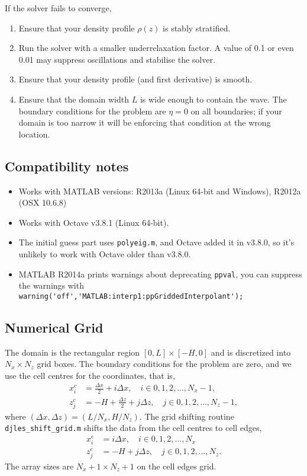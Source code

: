 \documentclass[letterpaper]{article}
\begin{document}
If the solver fails to converge, 
\begin{enumerate}
 \item Ensure that your density profile $\rho(z)$ is stably stratified.
 \item Run the solver with a smaller underrelaxation factor. A value of 0.1 or even 0.01 may suppress oscillations and stabilise the solver. 
 \item Ensure that your density profile (and first derivative) is smooth.
 \item Ensure that the domain width $L$ is wide enough to contain the wave. The boundary conditions for the problem are $\eta=0$ on all boundaries; if your domain is too narrow it will be enforcing that condition at the wrong location.
\end{enumerate}

\subsection{Compatibility notes}
\begin{itemize}
 \item Works with MATLAB versions: R2013a (Linux 64-bit and Windows), R2012a (OSX 10.6.8)
 \item Works with Octave v3.8.1 (Linux 64-bit).
 \item The initial guess part uses \verb+polyeig.m+, and Octave added it in v3.8.0, so it's unlikely to work with Octave older than v3.8.0.
 \item MATLAB R2014a prints warnings about deprecating \verb+ppval+, you can suppress the warnings with \\ \verb+warning('off','MATLAB:interp1:ppGriddedInterpolant');+
\end{itemize}

\subsection{Numerical Grid}
The domain is the rectangular region $[0,L] \times [-H,0]$ and is discretized into $N_x\times N_z$ grid boxes. The boundary conditions for the problem are zero, and we use the cell centres for the coordinates, that is,
\begin{align}
x_i^c &= \frac{\Delta x}{2}  + i \Delta x, \quad i \in 0,1,2,\ldots,N_x-1,\\
z_j^c &= -H + \frac{\Delta z}{2}  + j \Delta z, \quad j  \in 0,1,2,\ldots,N_z-1,
\end{align}
where $(\Delta x, \Delta z) = (L/N_x, H/N_z)$. The grid shifting routine \verb+djles_shift_grid.m+ shifts the data from the cell centres to cell edges, 
\begin{align}
x_i^e &= i \Delta x, \quad i \in 0,1,2,\ldots,N_x\\
z_j^e &= -H + j \Delta z, \quad j  \in 0,1,2,\ldots,N_z.
\end{align}
The array sizes are $N_x+1 \times N_z+1$ on the cell edges grid.
\end{document}
